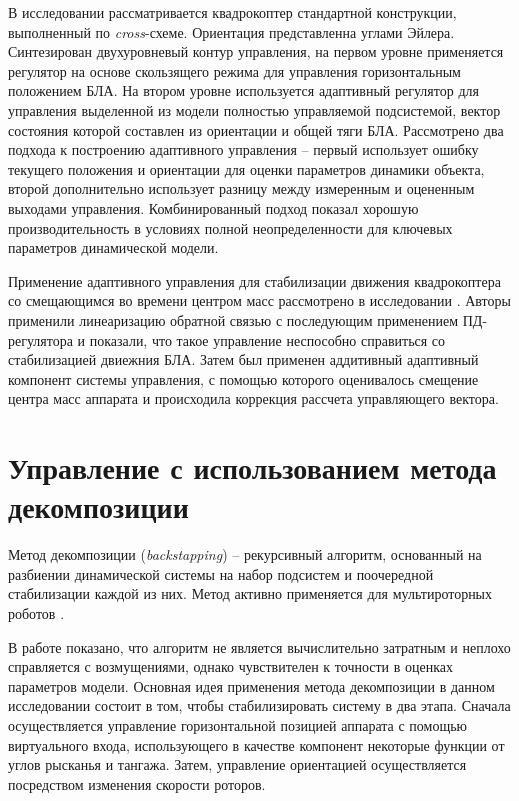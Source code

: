 В исследовании \cite{Bara01} рассматривается квадрокоптер стандартной конструкции, выполненный по \textit{cross}-схеме. Ориентация представленна углами Эйлера. Синтезирован двухуровневый контур управления, на первом уровне применяется регулятор на основе скользящего режима для управления горизонтальным положением БЛА. На втором уровне используется адаптивный регулятор для управления выделенной из модели полностью управляемой подсистемой, вектор состояния которой составлен из ориентации и общей тяги БЛА. Рассмотрено два подхода к построению адаптивного управления -- первый использует ошибку текущего положения и ориентации для оценки параметров динамики объекта, второй дополнительно использует разницу между измеренным и оцененным выходами управления. Комбинированный подход показал хорошую производительность в условиях полной неопределенности для ключевых параметров динамической модели.

Применение адаптивного управления для стабилизации движения квадрокоптера со смещающимся во времени центром масс рассмотрено в исследовании \cite{Palunko01}. Авторы применили линеаризацию обратной связью с последующим применением ПД-регулятора и показали, что такое управление неспособно справиться со стабилизацией двиежния БЛА. Затем был применен аддитивный адаптивный компонент системы управления, с помощью которого оценивалось смещение центра масс аппарата и происходила коррекция рассчета управляющего вектора.

\section{Управление с использованием метода декомпозиции}

Метод декомпозиции (\textit{backstapping}) -- рекурсивный алгоритм, основанный на разбиении динамической системы на набор подсистем и поочередной стабилизации каждой из них. Метод активно применяется для мультироторных роботов \cite{Pota01, Chen01, Jung01, Huo01}.

В работе \cite{Madani01} показано, что алгоритм не является вычислительно затратным и неплохо справляется с возмущениями, однако чувствителен к точности в оценках параметров модели. Основная идея применения метода декомпозиции в данном исследовании состоит в том, чтобы стабилизировать систему в два этапа. Сначала осуществляется управление горизонтальной позицией аппарата с помощью виртуального входа, использующего в качестве компонент некоторые функции от углов рысканья и тангажа. Затем, управление ориентацией осуществляется посредством изменения скорости роторов.

